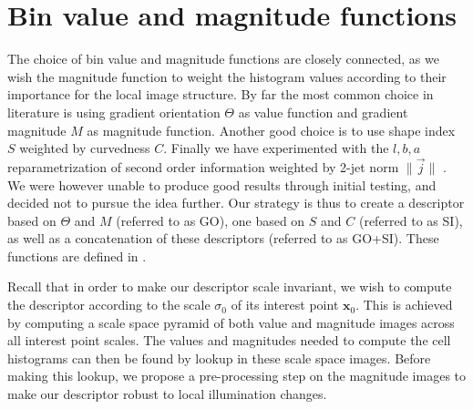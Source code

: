 \documentclass[thesis.tex]{subfiles}
\def\x{\mathbf{x}}
\begin{document}
\section{Bin value and magnitude functions}
\label{sec:valueMagnitudeFunctions}
%
The choice of bin value and magnitude functions are closely connected, as we wish the magnitude function to weight the histogram values according to their importance for the local image structure. By far the most common choice in literature \cite{lowe2004distinctive,ke2004pca,mikolajczyk2005performance,tola2008fast} is using gradient orientation $\Theta$ as value function and gradient magnitude $M$ as magnitude function. Another good choice \cite{pedersen2013shape} is to use shape index $S$ weighted by curvedness $C$. Finally we have experimented with the $l,b,a$ reparametrization of second order information weighted by 2-jet norm $\| \overset{\rightarrow}{j} \|$ \citep{griffin2007second}. We were however unable to produce good results through initial testing, and decided not to pursue the idea further. Our strategy is thus to create a descriptor based on $\Theta$ and $M$ (referred to as GO), one based on $S$ and $C$ (referred to as SI), as well as a concatenation of these descriptors (referred to as GO+SI). These functions are defined in .

Recall that in order to make our descriptor scale invariant, we wish to compute the descriptor according to the scale $\sigma_0$ of its interest point $\x_0$. This is achieved by computing a scale space pyramid of both value and magnitude images across all interest point scales. The values and magnitudes needed to compute the cell histograms can then be found by lookup in these scale space images. Before making this lookup, we propose a pre-processing step on the magnitude images to make our descriptor robust to local illumination changes.
%
\end{document}

